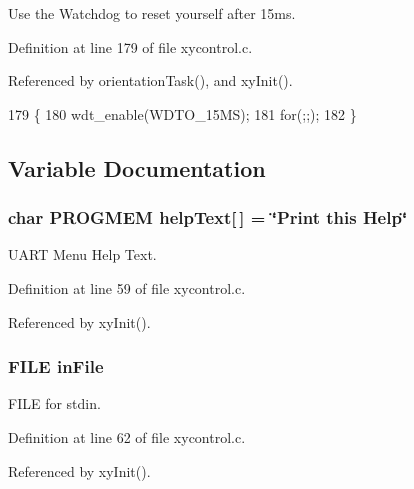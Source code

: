 Use the Watchdog to reset yourself after 15ms. 



Definition at line 179 of file xycontrol.\-c.



Referenced by orientation\-Task(), and xy\-Init().


\begin{DoxyCode}
179                        \{
180     wdt\_enable(WDTO\_15MS);
181     \textcolor{keywordflow}{for}(;;);
182 \}
\end{DoxyCode}


\subsection{Variable Documentation}
\hypertarget{group__xycontrol_gab29cf1c6b0f1a36311899902ec9364ea}{
\subsubsection[{help\-Text}]{\setlength{\rightskip}{0pt plus 5cm}char P\-R\-O\-G\-M\-E\-M help\-Text\mbox{[}$\,$\mbox{]} = \char`\"{}Print this Help\char`\"{}}}\label{group__xycontrol_gab29cf1c6b0f1a36311899902ec9364ea}


U\-A\-R\-T Menu Help Text. 



Definition at line 59 of file xycontrol.\-c.



Referenced by xy\-Init().

\hypertarget{group__xycontrol_gaad0ab56da43b41bbfeeaa3d1eca70e9c}{
\subsubsection[{in\-File}]{\setlength{\rightskip}{0pt plus 5cm}F\-I\-L\-E in\-File}}\label{group__xycontrol_gaad0ab56da43b41bbfeeaa3d1eca70e9c}


F\-I\-L\-E for stdin. 



Definition at line 62 of file xycontrol.\-c.



Referenced by xy\-Init().

